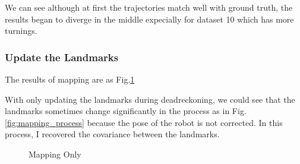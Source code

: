 \documentclass[conference]{IEEEtran}
\begin{document}
We can see although at first the trajectories match well with ground truth, the results began to diverge in the middle
expecially for dataset 10 which has more turnings.


\subsubsection{Update the Landmarks}
The results of mapping are as Fig.\ref{fig:mapping}

With only updating the landmarks during deadreckoning, we could see that the landmarks sometimes change significantly in
the process as in Fig.\ref{fig:mapping_process} because the pose of the robot is not corrected. In this process, I recovered
the covariance between the landmarks.

\begin{figure}[htbp]
    \centering

    \centering
    \caption{Mapping Only} \label{fig:mapping}
\end{figure}
\end{document}
